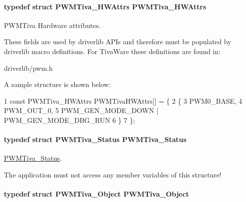 \paragraph[{P\+W\+M\+Tiva\+\_\+\+H\+W\+Attrs}]{\setlength{\rightskip}{0pt plus 5cm}typedef struct {\bf P\+W\+M\+Tiva\+\_\+\+H\+W\+Attrs}  {\bf P\+W\+M\+Tiva\+\_\+\+H\+W\+Attrs}}\label{_p_w_m_tiva_8h_a9dc35e1e545e80c16d6ac60c101e2143}


P\+W\+M\+Tiva Hardware attributes. 

These fields are used by driverlib A\+P\+Is and therefore must be populated by driverlib macro definitions. For Tiva\+Ware these definitions are found in\+:
\begin{DoxyItemize}
\item driverlib/pwm.\+h
\end{DoxyItemize}

A sample structure is shown below\+: 
\begin{DoxyCode}
1 const PWMTiva\_HWAttrs PWMTivaHWAttrs[] = \{
2     \{
3         PWM0\_BASE,
4         PWM\_OUT\_0,
5         PWM\_GEN\_MODE\_DOWN | PWM\_GEN\_MODE\_DBG\_RUN
6     \}
7 \};
\end{DoxyCode}
\paragraph[{P\+W\+M\+Tiva\+\_\+\+Status}]{\setlength{\rightskip}{0pt plus 5cm}typedef struct {\bf P\+W\+M\+Tiva\+\_\+\+Status}  {\bf P\+W\+M\+Tiva\+\_\+\+Status}}\label{_p_w_m_tiva_8h_a76a48f3f7fa2bec8b163b5dc1e5301ee}


\hyperlink{struct_p_w_m_tiva___status}{P\+W\+M\+Tiva\+\_\+\+Status}. 

The application must not access any member variables of this structure! 
\paragraph[{P\+W\+M\+Tiva\+\_\+\+Object}]{\setlength{\rightskip}{0pt plus 5cm}typedef struct {\bf P\+W\+M\+Tiva\+\_\+\+Object}  {\bf P\+W\+M\+Tiva\+\_\+\+Object}}\label{_p_w_m_tiva_8h_a6a177b361dfd0da20d6fa735b680b5c5}


